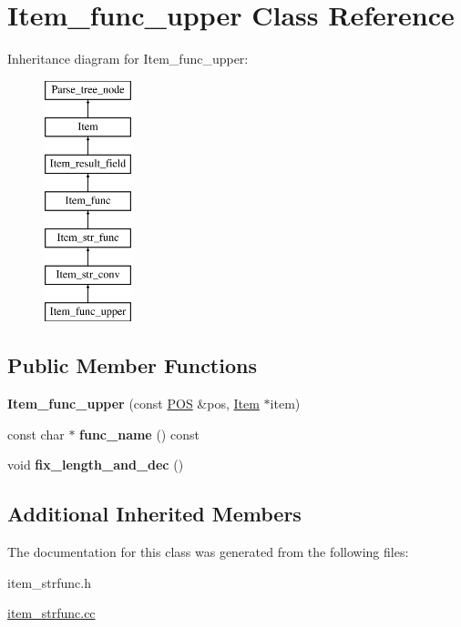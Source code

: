 \hypertarget{classItem__func__upper}{}\section{Item\+\_\+func\+\_\+upper Class Reference}
\label{classItem__func__upper}
Inheritance diagram for Item\+\_\+func\+\_\+upper\+:\begin{figure}[H]
\begin{center}
\leavevmode
\includegraphics[height=7.000000cm]{classItem__func__upper}
\end{center}
\end{figure}
\subsection*{Public Member Functions}
\begin{DoxyCompactItemize}
\item 
\mbox{\label{classItem__func__upper_a25ca8c4b346c6eb750ac78a1a57297c0}} 
{\bfseries Item\+\_\+func\+\_\+upper} (const \mbox{\hyperlink{structYYLTYPE}{P\+OS}} \&pos, \mbox{\hyperlink{classItem}{Item}} $\ast$item)
\item 
\mbox{\label{classItem__func__upper_a45c45b5fc3904805a97344311836e251}} 
const char $\ast$ {\bfseries func\+\_\+name} () const
\item 
\mbox{\label{classItem__func__upper_a40c7822dc45d78abdd2ddeeb098bfe57}} 
void {\bfseries fix\+\_\+length\+\_\+and\+\_\+dec} ()
\end{DoxyCompactItemize}
\subsection*{Additional Inherited Members}


The documentation for this class was generated from the following files\+:\begin{DoxyCompactItemize}
\item 
item\+\_\+strfunc.\+h\item 
\mbox{\hyperlink{item__strfunc_8cc}{item\+\_\+strfunc.\+cc}}\end{DoxyCompactItemize}
